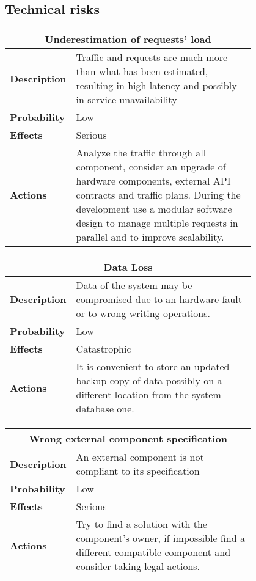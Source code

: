 \clearpage

\subsection{Technical risks}
\begin{longtable}{lp{0.8\linewidth}}
\multicolumn{2}{c}{\textbf{Underestimation of requests' load}}\\
\toprule
\textbf{Description}&Traffic and requests are much more than what has been estimated, resulting in high latency and possibly in service unavailability\\
\midrule
\textbf{Probability}&Low\\
\midrule
\textbf{Effects}&Serious\\
\midrule
\textbf{Actions}&Analyze the traffic through all component, consider an upgrade of hardware components, external API contracts and traffic plans. During the development use a modular software design to manage multiple requests in parallel and to improve scalability.\\
\bottomrule
\end{longtable}

\begin{longtable}{lp{0.8\linewidth}}
\multicolumn{2}{c}{\textbf{Data Loss}}\\
\toprule
\textbf{Description}&Data of the system may be compromised due to an hardware fault or to wrong writing operations.\\
\midrule
\textbf{Probability}&Low\\
\midrule
\textbf{Effects}&Catastrophic\\
\midrule
\textbf{Actions}&It is convenient to store an updated backup copy of data possibly on a different location from the system database one.\\
\bottomrule
\end{longtable}

\begin{longtable}{lp{0.8\linewidth}}
\multicolumn{2}{c}{\textbf{Wrong external component specification}}\\
\toprule
\textbf{Description}&An external component is not compliant to its specification\\
\midrule
\textbf{Probability}&Low\\
\midrule
\textbf{Effects}&Serious\\
\midrule
\textbf{Actions}&Try to find a solution with the component's owner, if impossible find a different compatible component and consider taking legal actions.\\
\bottomrule
\end{longtable}

